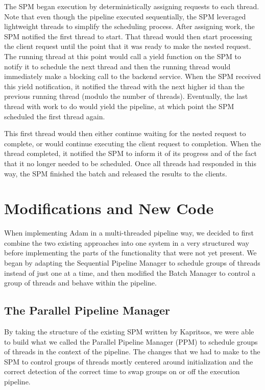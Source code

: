 \documentclass[11pt, oneside]{report}
\begin{document}
The SPM began execution by deterministically assigning requests to each thread. Note that even though the pipeline executed sequentially, the SPM leveraged lightweight threads to simplify the scheduling process. After assigning work, the SPM notified the first thread to start. That thread would then start processing the client request until the point that it was ready to make the nested request. The running thread at this point would call a yield function on the SPM to notify it to schedule the next thread and then the running thread would immediately make a blocking call to the backend service. When the SPM received this yield notification, it notified the thread with the next higher id than the previous running thread (modulo the number of threads). Eventually, the last thread with work to do would yield the pipeline, at which point the SPM scheduled the first thread again. 

This first thread would then either continue waiting for the nested request to complete, or would continue executing the client request to completion. When the thread completed, it notified the SPM to inform it of its progress and of the fact that it no longer needed to be scheduled. Once all threads had responded in this way, the SPM finished the batch and released the results to the clients.

\section{Modifications and New Code}

When implementing Adam in a multi-threaded pipeline way, we decided to first combine the two existing approaches into one system in a very structured way before implementing the parts of the functionality that were not yet present. We began by adapting the Sequential Pipeline Manager to schedule groups of threads instead of just one at a time, and then modified the Batch Manager to control a group of threads and behave within the pipeline.

\subsection{The Parallel Pipeline Manager}

By taking the structure of the existing SPM written by Kapritsos, we were able to build what we called the Parallel Pipeline Manager (PPM) to schedule groups of threads in the context of the pipeline. The changes that we had to make to the SPM to control groups of threads mostly centered around initialization and the correct detection of the correct time to swap groups on or off the execution pipeline.
\end{document}
